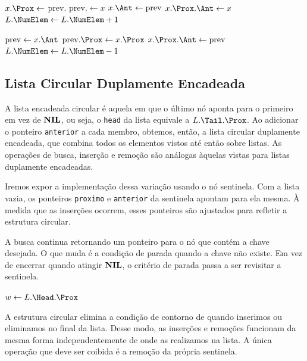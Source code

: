 \begin{function}[H]
\SetAlgoLined
\caption{Insere-Lista-D($L$, prev, $x$)}
$x.\Prox \gets $ prev.\Prox\;
prev.\Prox $\gets x$\;
$x.\Ant \gets \mathrm{prev}$\;
{
    $x.\Prox.\Ant \gets x$\;
}
$L.\NumElem \gets L.\NumElem + 1$\;
\end{function}

\begin{function}[H]
\SetAlgoLined
\caption{Remove-Lista-D($L$, $x$)}
$\mathrm{prev} \gets x.\Ant$\;
$\mathrm{prev}.\Prox \gets x.\Prox$\;
{
    $x.\Prox.\Ant \gets \mathrm{prev}$\;
}
$L.\NumElem \gets L.\NumElem - 1$\;
\end{function}

\subsection{Lista Circular Duplamente Encadeada}

A lista encadeada circular é aquela em que o último nó aponta para o primeiro em vez de
$\mathbf{NIL}$, ou seja, o \texttt{head} da lista equivale a $L.\Tail.\Prox$.
Ao adicionar o ponteiro \texttt{anterior} a cada membro, obtemos, então, a lista
circular duplamente encadeada, que combina todos os elementos vistos até então sobre listas.
As operações de busca, inserção e remoção são análogas àquelas vistas para listas
duplamente encadeadas.

Iremos expor a implementação dessa variação usando o nó sentinela.
Com a lista vazia, os ponteiros \texttt{proximo} e \texttt{anterior} da sentinela apontam
para ela mesma.
À medida que as inserções ocorrem, esses ponteiros são ajustados para refletir a
estrutura circular.

A busca continua retornando um ponteiro para o nó que contém a chave desejada.
O que muda é a condição de parada quando a chave não existe.
Em vez de encerrar quando atingir $\mathbf{NIL}$, o critério de parada passa a ser revisitar a
sentinela.

\begin{function}
\SetAlgoLined
\caption{Busca-Lista-DC($L$, $k$)}
$w \gets L.\Head.\Prox$\;
\;
\end{function}

A estrutura circular elimina a condição de contorno de quando inserimos ou eliminamos no
final da lista.
Desse modo, as inserções e remoções funcionam da mesma forma independentemente de onde as
realizamos na lista.
A única operação que deve ser coibida é a remoção da própria sentinela.


